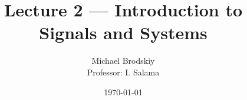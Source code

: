 


\title{Lecture 2 — Introduction to Signals and Systems}
\date{\today}
\author{Michael Brodskiy\\ \small Professor: I. Salama}



\maketitle

